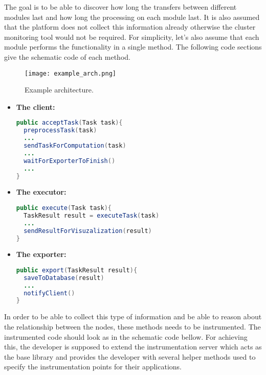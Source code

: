 The goal is to be able to discover how long the transfers between different modules last and how long the processing on each module last. It is also assumed that the platform does not collect this information already otherwise the cluster monitoring tool would not be required. For simplicity, let's also assume that each module performs the functionality in a single method. The following code sections give the schematic code of each method.

	\begin{figure}
		\centering
		\texttt{[image: example\_arch.png]}
		\caption{Example architecture.}
		\label{fig:example_arch}
	\end{figure}



\begin{itemize}
\item \textbf{The client:}
\begin{lstlisting}[language=Java]
public acceptTask(Task task){
  preprocessTask(task)
  ...
  sendTaskForComputation(task)
  ...
  waitForExporterToFinish()
  ...
}
\end{lstlisting}

\item \textbf{The executor:}
\begin{lstlisting}[language=Java]
public execute(Task task){
  TaskResult result = executeTask(task)
  ...
  sendResultForVisuzalization(result)
}
\end{lstlisting}

\item \textbf{The exporter:}
\begin{lstlisting}[language=Java]
public export(TaskResult result){
  saveToDatabase(result)
  ...
  notifyClient()
}
\end{lstlisting}
\end{itemize}

In order to be able to collect this type of information and be able to reason about the relationship between the nodes, these methods needs to be instrumented. The instrumented code should look as in the schematic code bellow. For achieving this, the developer is supposed to extend the instrumentation server which acts as the base library and provides the developer with several helper methods used to specify the instrumentation points for their applications. 

